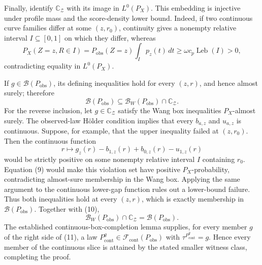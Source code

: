 Finally, identify \(\mathbb C_{\mathcal Z}\) with its image in \(L^0(P_X)\).  This embedding is injective under profile mass and the score-density lower bound.  Indeed, if two continuous curve families differ at some \((z,r_0)\), continuity gives a nonempty relative interval \(I\subseteq[0,1]\) on which they differ, whereas
\[
P_X(Z=z,R\in I)
=P_{\mathrm{obs}}(Z=z)\int_I p_z(t)\,dt
\ge\omega c_p\operatorname{Leb}(I)>0,
\tag{9}
\]
contradicting equality in \(L^0(P_X)\).

If \(g\in\mathcal B(P_{\mathrm{obs}})\), its defining inequalities hold for every \((z,r)\), and hence almost surely; therefore
\[
\mathcal B(P_{\mathrm{obs}})
\subseteq\mathcal B_W(P_{\mathrm{obs}})\cap\mathbb C_{\mathcal Z}.
\tag{10}
\]
For the reverse inclusion, let \(g\in\mathbb C_{\mathcal Z}\) satisfy the Wang box inequalities \(P_X\)-almost surely.  The observed-law H\"older condition implies that every \(b_{a,z}\) and \(u_{a,z}\) is continuous.  Suppose, for example, that the upper inequality failed at \((z,r_0)\).  Then the continuous function
\[
r\longmapsto g_z(r)-b_{1,z}(r)+b_{0,z}(r)-u_{1,z}(r)
\]
would be strictly positive on some nonempty relative interval \(I\) containing \(r_0\).  Equation (9) would make this violation set have positive \(P_X\)-probability, contradicting almost-sure membership in the Wang box.  Applying the same argument to the continuous lower-gap function rules out a lower-bound failure.  Thus both inequalities hold at every \((z,r)\), which is exactly membership in \(\mathcal B(P_{\mathrm{obs}})\).  Together with (10),
\[
\mathcal B_W(P_{\mathrm{obs}})\cap\mathbb C_{\mathcal Z}
=\mathcal B(P_{\mathrm{obs}}).
\tag{11}
\]
The established continuous-box-completion lemma supplies, for every member \(g\) of the right side of (11), a law \(P^g_{\mathrm{cont}}\in\mathcal F_{\mathrm{cont}}(P_{\mathrm{obs}})\) with \(\tau^{P^g_{\mathrm{cont}}}=g\).  Hence every member of the continuous slice is attained by the stated smaller witness class, completing the proof.
